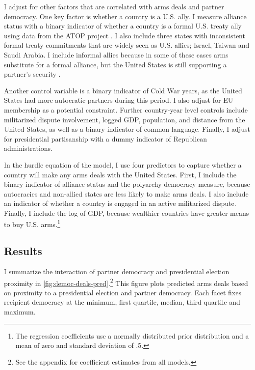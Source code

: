 \documentclass[12pt]{article}
\begin{document}
I adjust for other factors that are correlated with arms deals and partner democracy. 
One key factor is whether a country is a U.S. ally. 
I measure alliance status with a binary indicator of whether a country is a formal U.S. treaty ally using data from the ATOP project \citep{Leedsetal2002}.
I also include three states with inconsistent formal treaty commitments that are widely seen as U.S. allies; Israel, Taiwan and Saudi Arabia. 
I include informal allies because in some of these cases arms substitute for a formal alliance, but the United States is still supporting a partner's security \citep{Yarhi-Miloetal2016}. 


Another control variable is a binary indicator of Cold War years, as the United States had more autocratic partners during this period. 
I also adjust for EU membership as a potential constraint. 
Further country-year level controls include militarized dispute involvement, logged GDP, population, and distance from the United States, as well as a binary indicator of common language. 
Finally, I adjust for presidential partisanship with a dummy indicator of Republican administrations.  


In the hurdle equation of the model, I use four predictors to capture whether a country will make any arms deals with the United States. 
First, I include the binary indicator of alliance status and the polyarchy democracy measure, because autocracies and non-allied states are less likely to make arms deals. 
I also include an indicator of whether a country is engaged in an active militarized dispute. 
Finally, I include the log of GDP, because wealthier countries have greater means to buy U.S. arms.\footnote{The regression coefficients use a normally distributed prior distribution and a mean of zero and standard deviation of .5.}


\subsection{Results}


I summarize the interaction of partner democracy and presidential election proximity in \autoref{fig:democ-deals-pred}.\footnote{See the appendix for coefficient estimates from all models.}
This figure plots predicted arms deals based on proximity to a presidential election and partner democracy.
Each facet fixes recipient democracy at the minimum, first quartile, median, third quartile and maximum.
\end{document}
